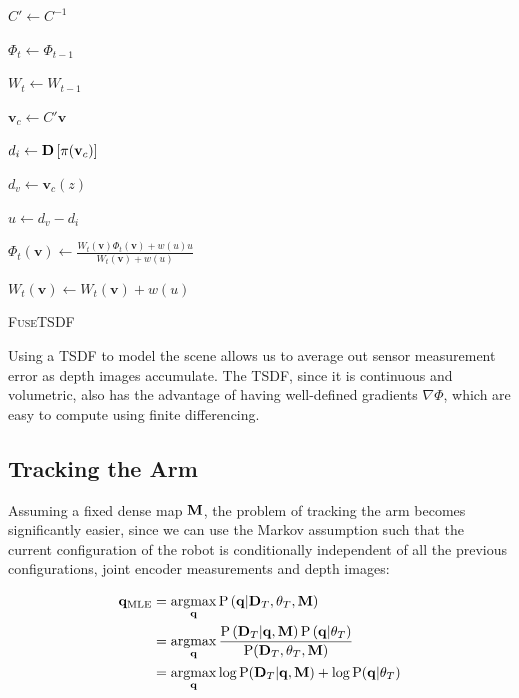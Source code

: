 \begin{algorithm}

$C' \gets {C}^{-1}$

$\Phi_{t} \gets \Phi_{t - 1}$

$W_{t} \gets W_{t - 1}$

{
    $\mathbf{v}_c \gets C' \mathbf{v}$
	
	$d_i \gets \mathbf{D}\left[\pi(\mathbf{v}_c)\right]$
	
	$d_v \gets \mathbf{v}_{c}(z)$
	
	$u \gets d_v - d_i$
	
	{
		$\Phi_{t}(\mathbf{v}) \gets \frac{W_{t}(\mathbf{v}) \Phi_{t}(\mathbf{v}) + w(u) u}{W_{t}(\mathbf{v}) + w(u)}$
		
		$W_{t}(\mathbf{v}) \gets W_t(\mathbf{v}) + w(u)$
	}
}
 
\caption{\textsc{FuseTSDF}}
\label{alg:TSDF}
\end{algorithm}

Using a TSDF to model the scene allows us to average out sensor measurement error as depth images accumulate. The TSDF, since it is continuous and volumetric, also has the advantage of having well-defined gradients $\nabla \Phi$, which are easy to compute using finite differencing.

\subsection{Tracking the Arm}
Assuming a fixed dense map $\mathbf{M}$, the problem of tracking the arm becomes significantly easier, since we can use the Markov assumption such that the current configuration of the robot is conditionally independent of all the previous configurations, joint encoder measurements and depth images:

\begin{align}
	\config_{\text{MLE}} &= \argmax_{\config} \Prob\left(\config | \DepthImage_T, \enc_T, \DenseMap\right) \\
						 &= \argmax_{\config} \frac{\Prob\left(\DepthImage_T | \config, \DenseMap\right)\Prob\left(\config | \enc_T\right)}{\Prob(\DepthImage_T, \enc_T, \DenseMap)} \\
						 &= \argmax_{\config} \log \Prob(\DepthImage_T | \config, \DenseMap) + \log \Prob(\config | \enc_T)				 
						 \label{eqn:dense_map_track}
\end{align}

